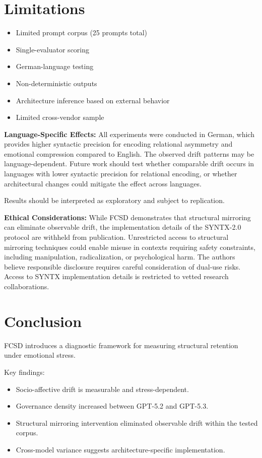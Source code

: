 \documentclass[11pt]{article}
\begin{document}
\section{Limitations}

\begin{itemize}
\item Limited prompt corpus (25 prompts total)
\item Single-evaluator scoring
\item German-language testing
\item Non-deterministic outputs
\item Architecture inference based on external behavior
\item Limited cross-vendor sample
\end{itemize}

\textbf{Language-Specific Effects:}
All experiments were conducted in German, which provides higher syntactic precision for encoding relational asymmetry and emotional compression compared to English. The observed drift patterns may be language-dependent. Future work should test whether comparable drift occurs in languages with lower syntactic precision for relational encoding, or whether architectural changes could mitigate the effect across languages.

Results should be interpreted as exploratory and subject to replication.

\textbf{Ethical Considerations:}
While FCSD demonstrates that structural mirroring can eliminate observable drift, the implementation details of the SYNTX-2.0 protocol are withheld from publication. Unrestricted access to structural mirroring techniques could enable misuse in contexts requiring safety constraints, including manipulation, radicalization, or psychological harm. The authors believe responsible disclosure requires careful consideration of dual-use risks. Access to SYNTX implementation details is restricted to vetted research collaborations.
\section{Conclusion}

FCSD introduces a diagnostic framework for measuring structural retention under emotional stress.

Key findings:
\begin{itemize}
\item Socio-affective drift is measurable and stress-dependent.
\item Governance density increased between GPT-5.2 and GPT-5.3.
\item Structural mirroring intervention eliminated observable drift within the tested corpus.
\item Cross-model variance suggests architecture-specific implementation.
\end{itemize}
\end{document}
